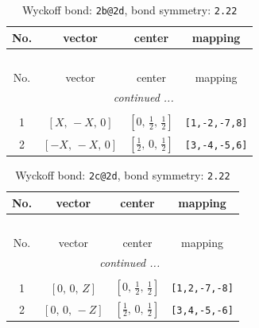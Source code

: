 \documentclass[fleqn,8pt]{jsarticle}
\begin{document}
\renewcommand{\arraystretch}{1.2}
\begin{longtable}{cccc}
\caption{Wyckoff bond: {\tt 2b@2d}, bond symmetry: {\tt 2.22}}
 \\
 \hline \hline
No. & vector & center & mapping \\ \hline \endfirsthead

\multicolumn{3}{l}{\tablename\ \thetable{}} \\
 \hline \hline
No. & vector & center & mapping \\ \hline \endhead

 \hline \hline
\multicolumn{3}{r}{\footnotesize\it continued ...} \\ \endfoot

 \hline \hline
\multicolumn{3}{r}{} \\ \endlastfoot

1 & $\left[ X,\, - X,\, 0 \right]$ & $\left[ 0,\, \frac{1}{2},\, \frac{1}{2} \right]$ & {\tt [1,-2,-7,8]} \\ \hline
2 & $\left[ - X,\, - X,\, 0 \right]$ & $\left[ \frac{1}{2},\, 0,\, \frac{1}{2} \right]$ & {\tt [3,-4,-5,6]} \\
\end{longtable}
\renewcommand{\arraystretch}{1.2}
\begin{longtable}{cccc}
\caption{Wyckoff bond: {\tt 2c@2d}, bond symmetry: {\tt 2.22}}
 \\
 \hline \hline
No. & vector & center & mapping \\ \hline \endfirsthead

\multicolumn{3}{l}{\tablename\ \thetable{}} \\
 \hline \hline
No. & vector & center & mapping \\ \hline \endhead

 \hline \hline
\multicolumn{3}{r}{\footnotesize\it continued ...} \\ \endfoot

 \hline \hline
\multicolumn{3}{r}{} \\ \endlastfoot

1 & $\left[ 0,\, 0,\, Z \right]$ & $\left[ 0,\, \frac{1}{2},\, \frac{1}{2} \right]$ & {\tt [1,2,-7,-8]} \\ \hline
2 & $\left[ 0,\, 0,\, - Z \right]$ & $\left[ \frac{1}{2},\, 0,\, \frac{1}{2} \right]$ & {\tt [3,4,-5,-6]} \\
\end{longtable}
\renewcommand{\arraystretch}{1.2}
\end{document}

